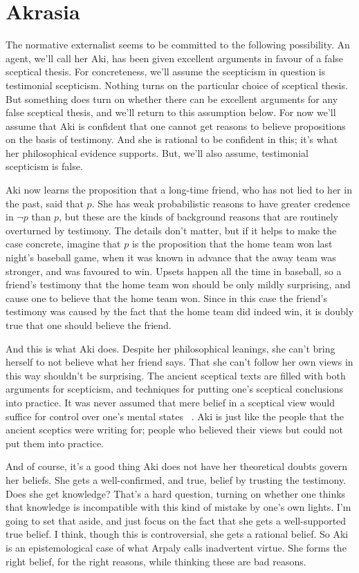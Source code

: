 \chapter{Akrasia}
\label{akrasia}

The normative externalist seems to be committed to the following possibility. An agent, we'll call her \gls{Aki}, has been given excellent arguments in favour of a false sceptical thesis. For concreteness, we'll assume the scepticism in question is testimonial scepticism. Nothing turns on the particular choice of sceptical thesis. But something does turn on whether there can be excellent arguments for any false sceptical thesis, and we'll return to this assumption below. For now we'll assume that \gls{Aki} is confident that one cannot get reasons to believe propositions on the basis of testimony. And she is rational to be confident in this; it's what her philosophical evidence supports. But, we'll also assume, testimonial scepticism is false.

\gls{Aki} now learns the proposition that a long-time friend, who has not lied to her in the past, said that $p$. She has weak probabilistic reasons to have greater credence in $\neg p$ than $p$, but these are the kinds of background reasons that are routinely overturned by testimony. The details don't matter, but if it helps to make the case concrete, imagine that $p$ is the proposition that the home team won last night's baseball game, when it was known in advance that the away team was stronger, and was favoured to win. Upsets happen all the time in baseball, so a friend's testimony that the home team won should be only mildly surprising, and cause one to believe that the home team won. Since in this case the friend's testimony was caused by the fact that the home team did indeed win, it is doubly true that one should believe the friend.

And this is what \gls{Aki} does. Despite her philosophical leanings, she can't bring herself to not believe what her friend says. That she can't follow her own views in this way shouldn't be surprising. The ancient sceptical texts are filled with both arguments for scepticism, and techniques for putting one's sceptical conclusions into practice. It was never assumed that mere belief in a sceptical view would suffice for control over one's mental states ~\citep{Morison2014}. \gls{Aki} is just like the people that the ancient sceptics were writing for; people who believed their views but could not put them into practice.

And of course, it's a good thing \gls{Aki} does not have her theoretical doubts govern her beliefs. She gets a well-confirmed, and true, belief by trusting the testimony. Does she get knowledge? That's a hard question, turning on whether one thinks that knowledge is incompatible with this kind of mistake by one's own lights. I'm going to set that aside, and just focus on the fact that she gets a well-supported true belief. I think, though this is controversial, she gets a rational belief. So \gls{Aki} is an epistemological case of what Arpaly calls inadvertent virtue. She forms the right belief, for the right reasons, while thinking these are bad reasons.

